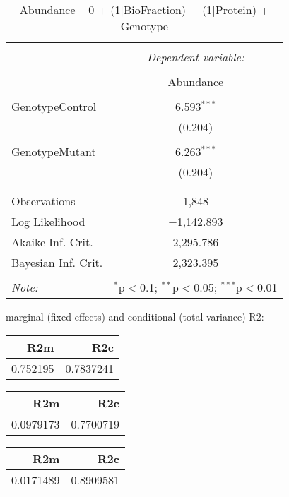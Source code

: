 \documentclass[11pt]{report}
\begin{document}
\begin{table}[!htbp] \centering 
  \caption{Abundance ~ 0 + (1|BioFraction) + (1|Protein) + Genotype} 
  \label{} 
\begin{tabular}{@{\extracolsep{5pt}}lc} 
\\[-1.8ex]\hline 
\hline \\[-1.8ex] 
 & \multicolumn{1}{c}{\textit{Dependent variable:}} \\ 
\cline{2-2} 
\\[-1.8ex] & Abundance \\ 
\hline \\[-1.8ex] 
 GenotypeControl & 6.593$^{***}$ \\ 
  & (0.204) \\ 
  & \\ 
 GenotypeMutant & 6.263$^{***}$ \\ 
  & (0.204) \\ 
  & \\ 
\hline \\[-1.8ex] 
Observations & 1,848 \\ 
Log Likelihood & $-$1,142.893 \\ 
Akaike Inf. Crit. & 2,295.786 \\ 
Bayesian Inf. Crit. & 2,323.395 \\ 
\hline 
\hline \\[-1.8ex] 
\textit{Note:}  & \multicolumn{1}{r}{$^{*}$p$<$0.1; $^{**}$p$<$0.05; $^{***}$p$<$0.01} \\ 
\end{tabular} 
\end{table} 
marginal (fixed effects) and conditional (total variance) R2:

\begin{tabular}{r|r}
\hline
R2m & R2c\\
\hline
0.752195 & 0.7837241\\
\hline
\end{tabular}

\begin{tabular}{r|r}
\hline
R2m & R2c\\
\hline
0.0979173 & 0.7700719\\
\hline
\end{tabular}

\begin{tabular}{r|r}
\hline
R2m & R2c\\
\hline
0.0171489 & 0.8909581\\
\hline
\end{tabular}
\end{document}
